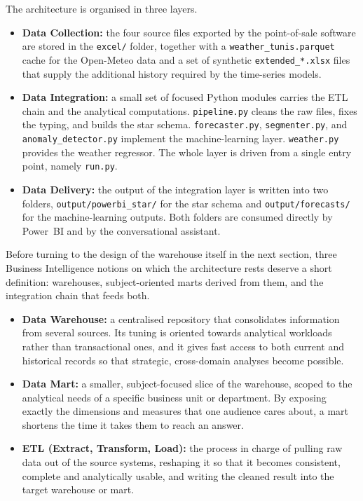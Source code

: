 \documentclass[12pt, a4paper]{report}
\begin{document}
The architecture is organised in three layers.

\begin{itemize}
  \item \textbf{Data Collection:} the four source files exported by the
        point-of-sale software are stored in the \texttt{excel/} folder,
        together with a \texttt{weather\_tunis.parquet} cache for the
        Open-Meteo data and a set of synthetic \texttt{extended\_*.xlsx}
        files that supply the additional history required by the
        time-series models.
  \item \textbf{Data Integration:} a small set of focused Python modules
        carries the ETL chain and the analytical computations.
        \texttt{pipeline.py} cleans the raw files, fixes the typing, and
        builds the star schema. \texttt{forecaster.py},
        \texttt{segmenter.py}, and \texttt{anomaly\_detector.py}
        implement the machine-learning layer.
        \texttt{weather.py} provides the weather regressor. The whole
        layer is driven from a single entry point, namely
        \texttt{run.py}.
  \item \textbf{Data Delivery:} the output of the integration layer is
        written into two folders, \texttt{output/powerbi\_star/} for the
        star schema and \texttt{output/forecasts/} for the
        machine-learning outputs. Both folders are consumed directly by
        Power~BI and by the conversational assistant.
\end{itemize}

Before turning to the design of the warehouse itself in the next section,
three Business Intelligence notions on which the architecture rests deserve
a short definition: warehouses, subject-oriented marts derived from them,
and the integration chain that feeds both.

\begin{itemize}
  \item \textbf{Data Warehouse:} a centralised repository that
        consolidates information from several sources. Its tuning is
        oriented towards analytical workloads rather than transactional
        ones, and it gives fast access to both current and historical
        records so that strategic, cross-domain analyses become
        possible.
  \item \textbf{Data Mart:} a smaller, subject-focused slice of the
        warehouse, scoped to the analytical needs of a specific
        business unit or department. By exposing exactly the dimensions
        and measures that one audience cares about, a mart shortens the
        time it takes them to reach an answer.
  \item \textbf{ETL (Extract, Transform, Load):} the process in charge
        of pulling raw data out of the source systems, reshaping it so
        that it becomes consistent, complete and analytically usable,
        and writing the cleaned result into the target warehouse or
        mart.
\end{itemize}
\end{document}

